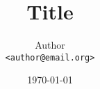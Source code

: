 \documentclass[8pt, a4paper]{extarticle}
\title{Title}
\date{\today}
\author{
    Author\\ \texttt{\textless author@email.org\textgreater}
}
\begin{document}
\begin{multicols*}{3}



\end{multicols*}
\end{document}
